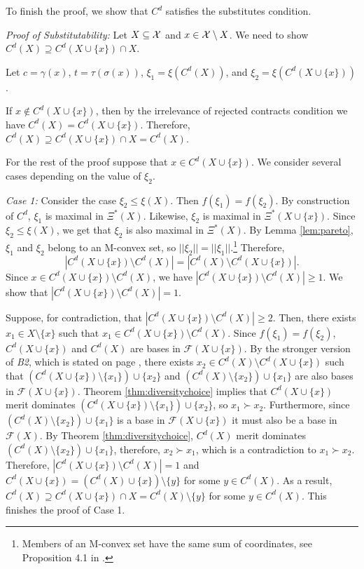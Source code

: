 \documentclass[12pt]{amsart}
\theoremstyle{remark}
\newcommand{\norm}[1]{|| #1 ||}
\newcommand{\abs}[1]{\left| #1 \right|}
\begin{document}
To finish the proof, we show that $C^d$ satisfies the substitutes condition.

\medskip
\noindent
\emph{Proof of Substitutability:}
Let $X \subseteq \mathcal{X}$ and $x \in \mathcal{X} \setminus X$. We need
to show $C^d(X)\supseteq C^d(X \cup \{x\}) \cap X$.

Let $c=\gamma(x)$, $t=\tau(\sigma(x))$, $\xi_1= \xi(C^d(X))$, and $\xi_2=\xi(C^d(X\cup\{x\}))$.

If $x\notin C^d(X \cup \{x\})$, then by the irrelevance of rejected contracts condition
we have $C^d(X)=C^d(X\cup\{x\})$. Therefore, $C^d(X)\supseteq C^d(X \cup \{x\}) \cap X= C^d(X)$.

For the rest of the proof suppose that $x\in C^d(X \cup \{x\})$.
We consider several cases depending on the value of $\xi_2$.



\smallskip
\emph{Case 1:} Consider the case $\xi_2 \leq \xi(X)$. Then $f(\xi_1)=f(\xi_2)$.
By construction of $C^d$, $\xi_1$ is maximal in $\Xi^*(X)$.
Likewise, $\xi_2$ is maximal in
$\Xi^*(X\cup\{x\})$. Since $\xi_2 \leq \xi(X)$, we get that $\xi_2$ is also
maximal in $\Xi^*(X)$. By Lemma \ref{lem:pareto}, $\xi_1$ and $\xi_2$ belong
to an M-convex set, so $\norm{\xi_2} = \norm{\xi_1}$.\footnote{Members of an M-convex set
have the same sum of coordinates, see Proposition 4.1 in \citet{Murota:SIAM:2003}.} Therefore,
\[\abs{C^d(X\cup\{x\})\setminus C^d(X)}=\abs{C^d(X)\setminus C^d(X\cup\{x\})}.\]
Since $x\in C^d(X\cup\{x\})\setminus C^d(X)$, we have $|C^d(X\cup\{x\})\setminus C^d(X)|\geq 1$. We show that
$|C^d(X\cup\{x\})\setminus C^d(X)|=1$.

Suppose, for contradiction, that $\abs{C^d(X\cup\{x\})\setminus C^d(X)}\geq 2$. Then,
there exists $x_1 \in X\setminus \{x\}$ such that $x_1 \in C^d(X\cup\{x\})\setminus C^d(X)$. Since
$f(\xi_1)=f(\xi_2)$, $C^d(X\cup\{x\})$ and $C^d(X)$ are bases in $\mathcal{F}(X\cup \{x\})$.
By the stronger version of \emph{B2}, which is stated on page \pageref{strongerB2}, there exists $x_2 \in C^d(X)\setminus C^d(X\cup\{x\})$ such
that $(C^d(X\cup\{x\}) \setminus \{x_1\}) \cup \{x_2\}$ and $(C^d(X) \setminus \{x_2\}) \cup \{x_1\}$
are also bases in $\mathcal{F}(X\cup \{x\})$.
Theorem \ref{thm:diversitychoice} implies that $C^d(X\cup\{x\})$ merit dominates $(C^d(X\cup\{x\})\setminus \{x_1\}) \cup \{x_2\}$, so
$x_1 \mathrel{\succ} x_2$. Furthermore, since
$(C^d(X) \setminus \{x_2\}) \cup \{x_1\}$ is a base in
$\mathcal{F}(X\cup \{x\})$ it must also be a base in $\mathcal{F}(X)$. By Theorem \ref{thm:diversitychoice},
$C^d(X)$ merit dominates $(C^d(X) \setminus \{x_2\}) \cup \{x_1\}$, therefore,
$x_2 \mathrel{\succ} x_1$, which is a
contradiction to $x_1 \mathrel{\succ} x_2$. Therefore, $|C^d(X\cup\{x\})\setminus C^d(X)|=1$ and
$C^d(X \cup\{x\})= (C^d(X) \cup \{x\})\setminus \{y\}$ for some $y\in C^d(X)$. As a result,
$C^d(X)\supseteq C^d(X \cup \{x\}) \cap X = C^d(X) \setminus \{y\}$ for some $y\in C^d(X)$.
This finishes the proof of Case 1.
\end{document}

